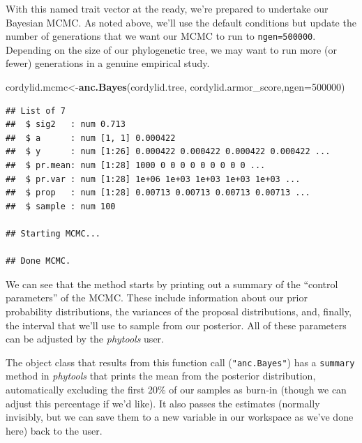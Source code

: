 \documentclass[fleqn,10pt,lineno]{wlpeerj} %
\newenvironment{Shaded}{\begin{snugshade}}{\end{snugshade}}
\newcommand{\AttributeTok}[1]{\textcolor[rgb]{0.13,0.29,0.53}{#1}}
\newcommand{\DecValTok}[1]{\textcolor[rgb]{0.00,0.00,0.81}{#1}}
\newcommand{\FunctionTok}[1]{\textcolor[rgb]{0.13,0.29,0.53}{\textbf{#1}}}
\newcommand{\NormalTok}[1]{#1}
\newcommand{\OtherTok}[1]{\textcolor[rgb]{0.56,0.35,0.01}{#1}}
\newcommand{\SpecialCharTok}[1]{\textcolor[rgb]{0.81,0.36,0.00}{\textbf{#1}}}
\begin{document}
\begin{Shaded}
\end{Shaded}

With this named trait vector at the ready, we're prepared to undertake our Bayesian MCMC. As noted above, we'll use the default conditions but update the number of generations that we want our MCMC to run to \texttt{ngen=500000}. Depending on the size of our phylogenetic tree, we may want to run more (or fewer) generations in a genuine empirical study.

\begin{Shaded}
\begin{Highlighting}[]
\NormalTok{cordylid.mcmc}\OtherTok{\textless{}{-}}\FunctionTok{anc.Bayes}\NormalTok{(cordylid.tree,}
\NormalTok{  cordylid.armor\_score,}\AttributeTok{ngen=}\DecValTok{500000}\NormalTok{)}
\end{Highlighting}
\end{Shaded}

\begin{verbatim}
## List of 7
##  $ sig2   : num 0.713
##  $ a      : num [1, 1] 0.000422
##  $ y      : num [1:26] 0.000422 0.000422 0.000422 0.000422 ...
##  $ pr.mean: num [1:28] 1000 0 0 0 0 0 0 0 0 0 ...
##  $ pr.var : num [1:28] 1e+06 1e+03 1e+03 1e+03 1e+03 ...
##  $ prop   : num [1:28] 0.00713 0.00713 0.00713 0.00713 ...
##  $ sample : num 100

## Starting MCMC...

## Done MCMC.
\end{verbatim}

We can see that the method starts by printing out a summary of the ``control parameters'' of the MCMC. These include information about our prior probability distributions, the variances of the proposal distributions, and, finally, the interval that we'll use to sample from our posterior. All of these parameters can be adjusted by the \emph{phytools} user.

The object class that results from this function call (\texttt{"anc.Bayes"}) has a \texttt{summary} method in \emph{phytools} that prints the mean from the posterior distribution, automatically excluding the first 20\% of our samples as burn-in (though we can adjust this percentage if we'd like). It also passes the estimates (normally invisibly, but we can save them to a new variable in our workspace as we've done here) back to the user.
\end{document}
